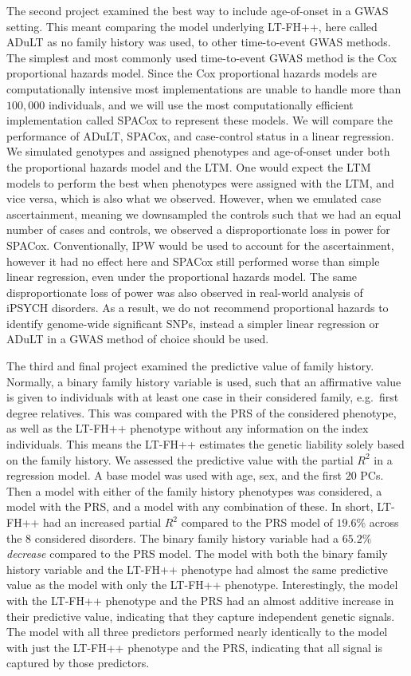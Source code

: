 The second project examined the best way to include age-of-onset in a GWAS setting. This meant comparing the model underlying LT-FH++, here called ADuLT as no family history was used, to other time-to-event GWAS methods. The simplest and most commonly used time-to-event GWAS method is the Cox proportional hazards model. Since the Cox proportional hazards models are computationally intensive most implementations are unable to handle more than $ 100,000 $ individuals, and we will use the most computationally efficient implementation called SPACox to represent these models. We will compare the performance of ADuLT, SPACox, and case-control status in a linear regression. We simulated genotypes and assigned phenotypes and age-of-onset under both the proportional hazards model and the LTM. One would expect the LTM models to perform the best when phenotypes were assigned with the LTM, and vice versa, which is also what we observed. However, when we emulated case ascertainment, meaning we downsampled the controls such that we had an equal number of cases and controls, we observed a disproportionate loss in power for SPACox. Conventionally, IPW would be used to account for the ascertainment, however it had no effect here and SPACox still performed worse than simple linear regression, even under the proportional hazards model. The same disproportionate loss of power was also observed in real-world analysis of iPSYCH disorders. As a result, we do not recommend proportional hazards to identify genome-wide significant SNPs, instead a simpler linear regression or ADuLT in a GWAS method of choice should be used.

The third and final project examined the predictive value of family history. Normally, a binary family history variable is used, such that an affirmative value is given to individuals with at least one case in their considered family, e.g.\ first degree relatives. This was compared with the PRS of the considered phenotype, as well as the LT-FH++ phenotype without any information on the index individuals. This means the LT-FH++ estimates the genetic liability solely based on the family history. We assessed the predictive value with the partial $ R^2 $ in a regression model. A base model was used with age, sex, and the first $ 20 $ PCs. Then a model with either of the family history phenotypes was considered, a model with the PRS, and a model with any combination of these. In short, LT-FH++ had an increased partial $ R^2 $ compared to the PRS model of $ 19.6\% $ across the $ 8 $ considered disorders. The binary family history variable had a $ 65.2\% $ \textit{decrease} compared to the PRS model. The model with both the binary family history variable and the LT-FH++ phenotype had almost the same predictive value as the model with only the LT-FH++ phenotype. Interestingly, the model with the LT-FH++ phenotype and the PRS had an almost additive increase in their predictive value, indicating that they capture independent genetic signals. The model with all three predictors performed nearly identically to the model with just the LT-FH++ phenotype and the PRS, indicating that all signal is captured by those predictors. 
 
